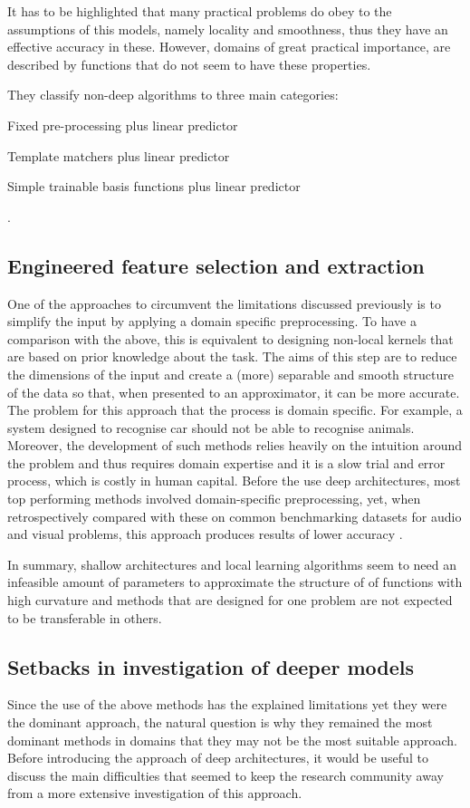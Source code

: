 \documentclass[a4paper]{report}
\begin{document}
		It has to be highlighted that many practical problems do obey to the assumptions of this models, namely locality and smoothness, thus they have an effective accuracy in these. However, domains of great practical importance, are described by functions that do not seem to have these properties. 
		
		They classify non-deep algorithms to three main categories: 
		\begin{enumerate*}
			\item Fixed pre-processing plus linear predictor		
			\item Template matchers plus linear predictor
			\item Simple trainable basis functions plus linear predictor
		\end{enumerate*}.

	\subsection{Engineered feature selection and extraction}
		One of the approaches to circumvent the limitations discussed previously is to simplify the input by applying a domain specific preprocessing. To have a comparison with the above, this is equivalent to designing non-local kernels that are based on prior knowledge about the task. The aims of this step are to reduce the dimensions of the input and create a (more) separable and smooth structure of the data so that, when presented to an approximator, it can be more accurate. The problem for this approach that the process is domain specific\cite{Bengio2007}. For example, a system designed to recognise car should not  be able to recognise animals. Moreover, the development of such methods relies heavily on the intuition around the problem and thus requires domain expertise and it is a slow trial and error process, which is costly in human capital. Before the use deep architectures, most top performing methods involved domain-specific preprocessing, yet, when retrospectively compared with these on common benchmarking datasets for audio and visual problems, this approach produces results of lower accuracy \cite{Krizhevsky2012}.
	
	In summary, shallow architectures and local learning algorithms seem to need an infeasible amount of parameters to approximate the structure of of functions with high curvature and methods that are designed for one problem are not expected to be transferable in others.
	\subsection{Setbacks in investigation of deeper models}
		Since the use of the above methods has the explained limitations yet they were the dominant approach, the natural question is why they remained the most dominant methods in domains that they may not be the most suitable approach. Before introducing the approach of deep architectures, it would be useful to discuss the main difficulties that seemed to keep the research community away from a more extensive investigation of this approach.
		
\end{document}
